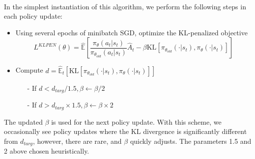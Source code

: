 \paragraph{}In the simplest instantiation of this algorithm, we perform the following steps in each policy update:
\begin{itemize}
\item Using several epochs of minibatch SGD, optimize the KL-penalized objective
\begin{equation}
L^{KLPEN}(\theta)=\hat{\mathbb{E}}\left[\frac{\pi_{\theta}(a_{t}|s_{t})}{\pi_{\theta_{old}}(a_{t}|s_{t})}\hat{A}_{t}-\beta\text{KL}[\pi_{\theta_{old}}(\cdot|s_{t}),\pi_{\theta}(\cdot|s_{t})]\right]
\end{equation}
\item Compute $d=\hat{\mathbb{E}}_{t}[\text{KL}[\pi_{\theta_{old}}(\cdot|s_{t}), \pi_{\theta}(\cdot|s_{t})]]$
	\begin{itemize}
		\item[-] If $d < d_{targ}/1.5, \beta \leftarrow \beta/2$
		\item[-] If $d > d_{targ} \times 1.5, \beta \leftarrow \beta \times 2$
	\end{itemize}
\end{itemize}
The updated $\beta$ is used for the next policy update. With this scheme, we occasionally see policy updates where the KL divergence is significantly different from $d_{targ}$, however, there are rare, and $\beta$ quickly adjusts. The parameters 1.5 and 2 above chosen heuristically.